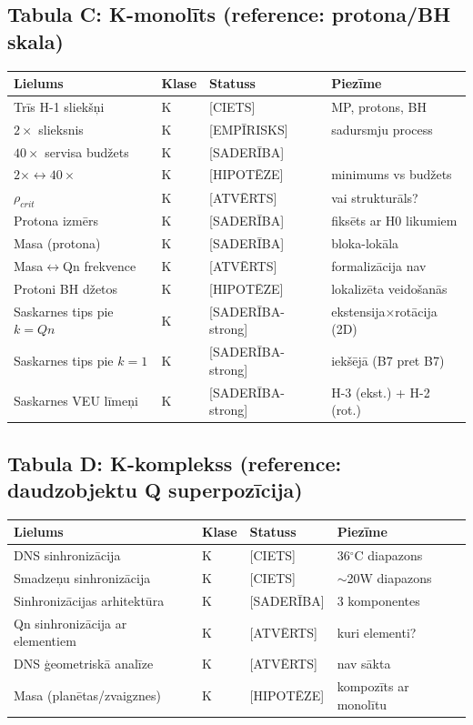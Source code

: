 \documentclass[12pt,a4paper]{article}
\newcommand{\dg}{\ensuremath{^\circ}}
\begin{document}
\subsection*{Tabula C: K-monolīts (reference: protona/BH skala)}

\begin{longtable}{|l|l|l|l|}
\hline
\textbf{Lielums} & \textbf{Klase} & \textbf{Statuss} & \textbf{Piezīme} \\
\hline
\endhead
Trīs H-1 sliekšņi & K & [CIETS] & MP, protons, BH \\
$2\times$ slieksnis & K & [EMPĪRISKS] & sadursmju process \\
$40\times$ servisa budžets & K & [SADERĪBA] & \\
$2\times\leftrightarrow 40\times$ & K & [HIPOTĒZE] & minimums vs budžets \\
$\rho_{crit}$ & K & [ATVĒRTS] & vai strukturāls? \\
Protona izmērs & K & [SADERĪBA] & fiksēts ar H0 likumiem \\
Masa (protona) & K & [SADERĪBA] & bloka-lokāla \\
Masa$\leftrightarrow$Qn frekvence & K & [ATVĒRTS] & formalizācija nav \\
Protoni BH džetos & K & [HIPOTĒZE] & lokalizēta veidošanās \\
\hline
Saskarnes tips pie $k=Qn$ & K & [SADERĪBA-strong] & ekstensija$\times$rotācija (2D) \\
Saskarnes tips pie $k=1$ & K & [SADERĪBA-strong] & iekšējā (B7 pret B7) \\
Saskarnes VEU līmeņi & K & [SADERĪBA-strong] & H-3 (ekst.) + H-2 (rot.) \\
\hline
\end{longtable}

\subsection*{Tabula D: K-komplekss (reference: daudzobjektu Q superpozīcija)}

\begin{longtable}{|l|l|l|l|}
\hline
\textbf{Lielums} & \textbf{Klase} & \textbf{Statuss} & \textbf{Piezīme} \\
\hline
\endhead
DNS sinhronizācija & K & [CIETS] & 36\dg C diapazons \\
Smadzeņu sinhronizācija & K & [CIETS] & $\sim$20W diapazons \\
Sinhronizācijas arhitektūra & K & [SADERĪBA] & 3 komponentes \\
Qn sinhronizācija ar elementiem & K & [ATVĒRTS] & kuri elementi? \\
DNS ģeometriskā analīze & K & [ATVĒRTS] & nav sākta \\
\hline
Masa (planētas/zvaigznes) & K & [HIPOTĒZE] & kompozīts ar monolītu \\
\hline
\end{longtable}
\end{document}
